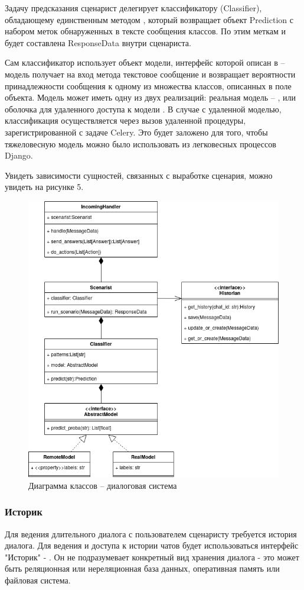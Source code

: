     Задачу предсказания сценарист делегирует классификатору (Classifier),
    обладающему единственным методом , который
    возвращает объект Prediction с набором меток обнаруженных в тексте сообщения
    классов. По этим меткам и будет составлена ResponseData внутри сценариста.

    Сам классификатор использует объект модели, интерфейс которой описан в
     -- модель получает на вход метода
     текстовое сообщение и возвращает
    вероятности принадлежности сообщения к одному из множества классов,
    описанных в поле  объекта. Модель может
    иметь одну из двух реализаций: реальная модель -- ,
    или оболочка для удаленного доступа к модели .
    В случае с удаленной моделью, классификация осуществляется через вызов
    удаленной процедуры, зарегистрированной с задаче Celery.
    Это будет заложено для того, чтобы тяжеловесную модель можно было использовать
    из легковесных процессов Django.

    Увидеть зависимости сущностей, связанных с выработке сценария, можно увидеть
    на рисунке 5.
    \begin{figure}[H]
        \centering
        \includegraphics[width=0.7\linewidth]{static/ClassDiagram_classifier.png}
        \caption{Диаграмма классов -- диалоговая система}
        \label{fig:class-diagram-classifier}
    \end{figure}


    \subsubsection{Историк}
    Для ведения длительного диалога с пользователем сценаристу требуется история
    диалога. Для ведения и доступа к истории чатов будет использоваться интерфейс
    "Историк" - . Он не подразумевает конкретный вид хранения
    диалога - это может быть реляционная или нереляционная база данных,
    оперативная память или файловая система.
    
